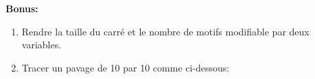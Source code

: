 \textbf{Bonus:}

\begin{enumerate}
    \item Rendre la taille du carré et le nombre de motifs modifiable par deux variables.
    \item Tracer un pavage de 10 par 10 comme ci-dessous:
    \def\side{1.2}
    \begin{center}
    \end{center}
    
\end{enumerate}